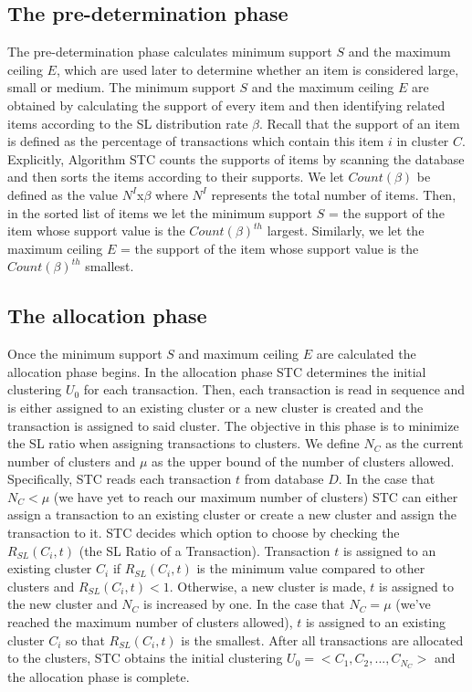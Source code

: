 \documentclass[11pt,reqno]{amsart}
\theoremstyle{definition}
\numberwithin{equation}{subsection}
\begin{document}
\subsection{The pre-determination phase}The pre-determination phase calculates minimum support $S$ and the maximum ceiling $E$, which are used later to determine whether an item is considered large, small or medium. The minimum support $S$ and the maximum ceiling $E$ are obtained by calculating the support of every item and then identifying related items according to the SL distribution rate $\beta$.  Recall that the support of an item is defined as the percentage of transactions which contain this item $i$ in cluster $C$. Explicitly, Algorithm STC counts the supports of items by scanning the database and then sorts the items according to their supports. We let $Count(\beta)$ be defined as the value $N^I$x$\beta$ where  $N^I$ represents the total number of items. Then, in the sorted list of items we let the minimum support $S$ = the support of the item whose support value is the $Count(\beta)^{th}$ largest.  Similarly, we let the maximum ceiling $E$ = the support of the item whose support value is the $Count(\beta)^{th}$ smallest. 

\subsection{The allocation phase} Once the minimum support $S$ and maximum ceiling $E$ are calculated the allocation phase begins. In the allocation phase STC determines the initial clustering $U_0$ for each transaction. Then, each transaction is read in sequence and is either assigned to an existing cluster or a new cluster is created and the transaction is assigned to said cluster. The objective in this phase is to minimize the SL ratio when assigning transactions to clusters.  We define $N_C$ as the current number of clusters and $\mu$ as the upper bound of the number of clusters allowed. Specifically, STC reads each transaction $t$ from database $D$. In the case that $N_C < \mu$ (we have yet to reach our maximum number of clusters) STC can either assign a transaction to an existing cluster or create a new cluster and assign the transaction to it. STC decides which option to choose by checking the $R_{SL}(C_i,t)$ (the SL Ratio of a Transaction). Transaction $t$ is assigned to an existing cluster $C_i$ if  $R_{SL}(C_i,t)$ is the minimum value compared to other clusters and $R_{SL}(C_i,t) < 1$. Otherwise, a new cluster is made, $t$ is assigned to the new cluster and $N_C$ is increased by one. In the case that $N_C = \mu$ (we've reached the maximum number of clusters allowed), $t$ is assigned to an existing cluster $C_i$ so that $R_{SL}(C_i,t)$ is the smallest. After all transactions are allocated to the clusters, STC obtains the initial clustering $U_0 =< C_1 , C_2 , ..., C_{N_C} >$ and the allocation phase is complete.
\end{document}

